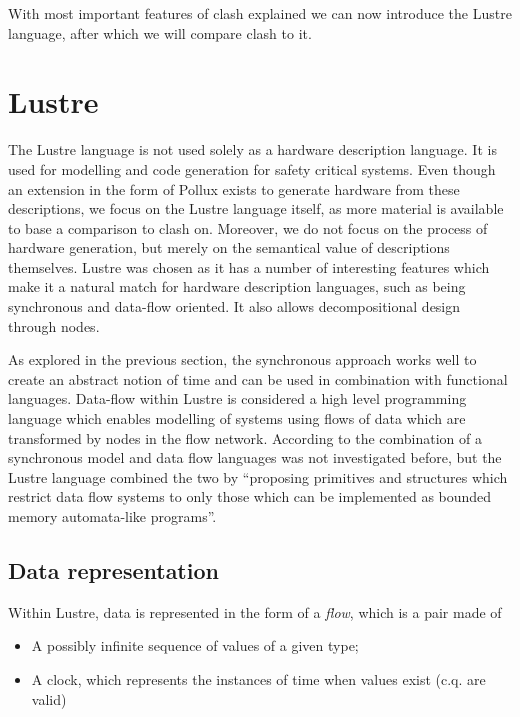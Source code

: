 With most important features of \gls{clash} explained we can now introduce the Lustre language, after which we will compare \gls{clash} to it.

\section{Lustre}
The Lustre\cite{halbwachs1991synchronous} language is not used solely as a hardware description language.
It is used for modelling and code generation for safety critical systems.
Even though an extension in the form of Pollux\cite{rocheteau1994pollux} exists to generate hardware from these descriptions, we focus on the Lustre language itself, as more material is available to base a comparison to \gls{clash} on.
Moreover, we do not focus on the process of hardware generation, but merely on the semantical value of descriptions themselves.
Lustre was chosen as it has a number of interesting features which make it a natural match for hardware description languages, such as being synchronous and data-flow oriented.
It also allows decompositional design through nodes.

As explored in the previous section, the synchronous approach works well to create an abstract notion of time and can be used in combination with functional languages. 
Data-flow\cite{ackerman1982data} within Lustre is considered a high level programming language which enables modelling of systems using flows of data which are transformed by nodes in the flow network.
According to \citeauthor{halbwachs1991synchronous} the combination of a synchronous model and data flow languages was not investigated before, but the Lustre language combined the two by ``proposing primitives and structures which restrict data flow systems to only those which can be implemented as bounded memory automata-like programs''\cite{halbwachs1991synchronous}.

\subsection{Data representation}
Within Lustre, data is represented in the form of a \textit{flow}, which is a pair made of
\begin{itemize}
 \item A possibly infinite sequence of values of a given type;
 \item A clock, which represents the instances of time when values exist (c.q. are valid)
\end{itemize}

